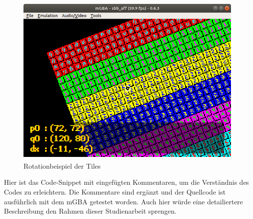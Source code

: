 \begin{figure}[h]
	\centering
	\includegraphics[height=85mm]{img/rotation.png}
	\caption{Rotationbeispiel der Tiles}
\end{figure}

Hier ist das Code-Snippet mit eingefügten Kommentaren, um die Verständnis des Codes zu erleichtern. Die Kommentare sind ergänzt und der Quellcode ist ausführlich mit dem mGBA getestet worden. Auch hier würde eine detailiertere Beschreibung den Rahmen dieser Studienarbeit sprengen.

